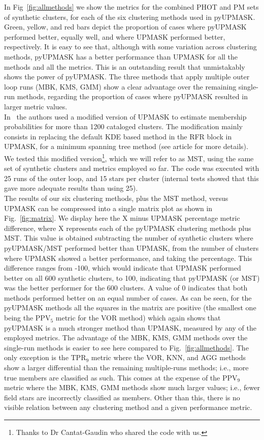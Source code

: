 \documentclass[draft]{aa}
\begin{document}
 In Fig~\ref{fig:allmethods} we show the metrics for the combined PHOT and PM
 sets of synthetic clusters, for each of the six clustering methods used in
 pyUPMASK. Green, yellow, and red bars depict the proportion of cases where
 pyUPMASK performed better, equally well, and where UPMASK performed
 better, respectively.
 It is easy to see that, although with some variation across clustering methods,
 pyUPMASK has a better performance than UPMASK for all the methods and all the
 metrics.
 This is an outstanding result that unmistakably shows the power of pyUPMASK.
 The three methods that apply multiple outer loop runs (MBK, KMS, GMM) show a
 clear advantage over the remaining single-run methods, regarding the
 proportion of cases where pyUPMASK resulted in larger metric values.\\

 In~\cite{Cantat_2018} the authors used a modified version of UPMASK to
 estimate membership probabilities for more than 1200 cataloged clusters. The
 modification mainly consists in replacing the default KDE based method in the
 RFR block in UPMASK, for a minimum spanning tree method (see article for more
 details). We tested this modified version\footnote{Thanks to Dr Cantat-Gaudin
 who shared the code with us.}, which we will refer to as MST, using the same
 set of synthetic clusters and metrics employed so far. The code was executed
 with 25 runs of the outer loop, and 15 stars per cluster (internal tests
 showed that this gave more adequate results than using 25).\\

 The results of our six clustering methods, plus the MST method, versus UPMASK
 can be compressed into a single matrix plot as shown in
 Fig.~\ref{fig:matrix}. We display here the X minus UPMASK percentage
 metric difference, where X represents each of the pyUPMASK clustering methods
 plus MST. This value is obtained subtracting the number of synthetic clusters
 where pyUPMASK/MST performed better than UPMASK, from the number of clusters
 where UPMASK showed a better performance, and taking the percentage.
 This difference ranges from -100, which would indicate that UPMASK performed
 better on all 600 synthetic clusters, to 100, indicating that pyUPMASK (or
 MST) was the better performer for the 600 clusters. A value of 0 indicates
 that both methods performed better on an equal number of cases.
 As can be seen, for the pyUPMASK methods all the squares in the matrix are
 positive (the smallest one being the PPV$_5$ metric for the VOR method) which
 again shows that pyUPMASK is a much stronger method than UPMASK, measured by
 any of the employed metrics.
 The advantage of the MBK, KMS, GMM methods over the single-run methods is
 easier to see here compared to Fig.~\ref{fig:allmethods}. The only exception
 is the TPR$_9$ metric where the VOR, KNN, and AGG methods show a larger
 differential than the remaining multiple-runs methods; i.e., more true members
 are classified as such. This comes at the expense of the PPV$_9$ metric where
 the MBK, KMS, GMM methods show much larger values; i.e., fewer field stars are
 incorrectly classified as members. Other than this, there is no visible
 relation between any clustering method and a given performance metric.
\end{document}
